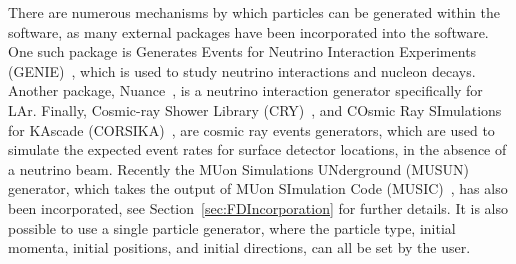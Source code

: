 There are numerous mechanisms by which particles can be generated within the software, as many external packages have been incorporated into the software. One such package is Generates Events for Neutrino Interaction Experiments (GENIE)~\citep{GENIE}, which is used to study neutrino interactions and nucleon decays. Another package, Nuance~\citep{Nuance}, is a neutrino interaction generator specifically for LAr. Finally, Cosmic-ray Shower Library (CRY)~\citep{CRY,CRY2}, and COsmic Ray SImulations for KAscade (CORSIKA)~\citep{CORSIKA}, are cosmic ray events generators, which are used to simulate the expected event rates for surface detector locations, in the absence of a neutrino beam. Recently the MUon Simulations UNderground (MUSUN)~\citep{MUSUN, MUSUN2} generator, which takes the output of MUon SImulation Code (MUSIC)~\citep{MUSUN, MUSIC, MUSIC2}, has also been incorporated, see Section~\ref{sec:FDIncorporation} for further details. It is also possible to use a single particle generator, where the particle type, initial momenta, initial positions, and initial directions, can all be set by the user. \\

